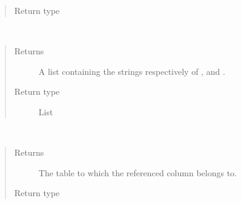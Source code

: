 \documentclass[letterpaper,10pt,english]{sphinxmanual}
\begin{document}
\begin{fulllineitems}
\begin{fulllineitems}
\begin{quote}
\begin{description}
\item[{Return type}] \leavevmode
\sphinxAtStartPar
{\hyperref[\detokenize{model:mini_sql.model.column.Column}]{}}

\end{description}\end{quote}

\end{fulllineitems}


\begin{fulllineitems}
\label{\detokenize{model:mini_sql.model.foreign_key.ForeignKey.get_strings}}~\begin{quote}\begin{description}
\item[{Returns}] \leavevmode
\sphinxAtStartPar
A list containing the strings respectively of , 
and .

\item[{Return type}] \leavevmode
\sphinxAtStartPar
List

\end{description}\end{quote}

\end{fulllineitems}


\begin{fulllineitems}
\label{\detokenize{model:mini_sql.model.foreign_key.ForeignKey.get_table}}~\begin{quote}\begin{description}
\item[{Returns}] \leavevmode
\sphinxAtStartPar
The table to which the referenced column belongs to.

\item[{Return type}] \leavevmode
\sphinxAtStartPar
{\hyperref[\detokenize{model:mini_sql.model.table.Table}]{}}


\end{description}
\end{quote}
\end{fulllineitems}
\end{fulllineitems}
\end{document}
